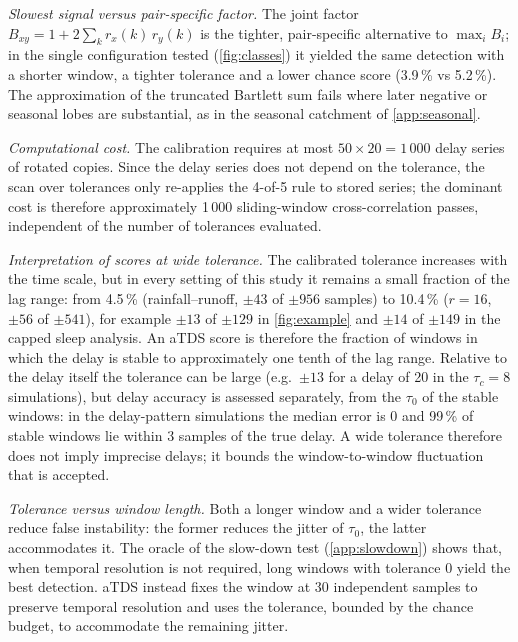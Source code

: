 \documentclass[11pt,a4paper]{article}
\begin{document}
\emph{Slowest signal versus pair-specific factor.} The joint factor $B_{xy} = 1 + 2\sum_k r_x(k)\,r_y(k)$ is the tighter, pair-specific alternative to $\max_i B_i$; in the single configuration tested (\cref{fig:classes}) it yielded the same detection with a shorter window, a tighter tolerance and a lower chance score (3.9\,\% vs 5.2\,\%). The approximation of the truncated Bartlett sum fails where later negative or seasonal lobes are substantial, as in the seasonal catchment of \cref{app:seasonal}.

\emph{Computational cost.} The calibration requires at most $50 \times 20 = 1\,000$ delay series of rotated copies. Since the delay series does not depend on the tolerance, the scan over tolerances only re-applies the 4-of-5 rule to stored series; the dominant cost is therefore approximately 1\,000 sliding-window cross-correlation passes, independent of the number of tolerances evaluated.

\emph{Interpretation of scores at wide tolerance.} The calibrated tolerance increases with the time scale, but in every setting of this study it remains a small fraction of the lag range: from 4.5\,\% (rainfall--runoff, $\pm43$ of $\pm956$ samples) to 10.4\,\% ($r = 16$, $\pm56$ of $\pm541$), for example $\pm13$ of $\pm129$ in \cref{fig:example} and $\pm14$ of $\pm149$ in the capped sleep analysis. An aTDS score is therefore the fraction of windows in which the delay is stable to approximately one tenth of the lag range. Relative to the delay itself the tolerance can be large (e.g.\ $\pm13$ for a delay of 20 in the $\tau_c = 8$ simulations), but delay accuracy is assessed separately, from the $\tau_0$ of the stable windows: in the delay-pattern simulations the median error is 0 and 99\,\% of stable windows lie within 3 samples of the true delay. A wide tolerance therefore does not imply imprecise delays; it bounds the window-to-window fluctuation that is accepted.

\emph{Tolerance versus window length.} Both a longer window and a wider tolerance reduce false instability: the former reduces the jitter of $\tau_0$, the latter accommodates it. The oracle of the slow-down test (\cref{app:slowdown}) shows that, when temporal resolution is not required, long windows with tolerance 0 yield the best detection. aTDS instead fixes the window at 30 independent samples to preserve temporal resolution and uses the tolerance, bounded by the chance budget, to accommodate the remaining jitter.
\end{document}
